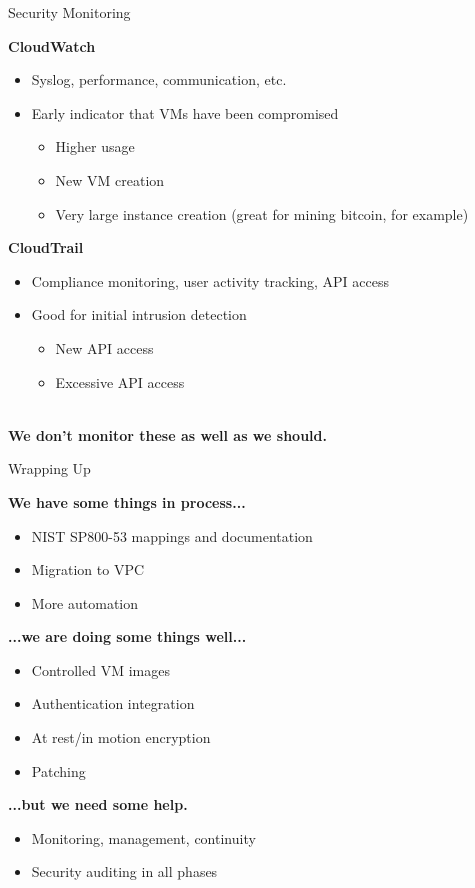 \documentclass[t,handout]{beamer}   %
\begin{document}
\begin{frame}{Security Monitoring}

\textbf{CloudWatch}
{\small
\begin{itemize}
\item Syslog, performance, communication, etc.
\item Early indicator that VMs have been compromised
\begin{itemize}
\item Higher usage
\item New VM creation
\item Very large instance creation (great for mining bitcoin, for example)
\end{itemize}
\end{itemize}
}

\textbf{CloudTrail}
{\small
\begin{itemize}
\item Compliance monitoring, user activity tracking, API access
\item Good for initial intrusion detection
\begin{itemize}
\item New API access
\item Excessive API access
\end{itemize}
\end{itemize}
}
~\\
\centering
\textbf{We don't monitor these as well as we should.}
\end{frame}

\begin{frame}{Wrapping Up}

\textbf{We have some things in process...}
{\small
\begin{itemize}
\item NIST SP800-53 mappings and documentation
\item Migration to VPC
\item More automation
\end{itemize}
}

\textbf{...we are doing some things well...}
{\small
\begin{itemize}
\item Controlled VM images
\item Authentication integration
\item At rest/in motion encryption
\item Patching
\end{itemize}
}

\textbf{...but we need some help.}
{\small
\begin{itemize}
\item Monitoring, management, continuity
\item Security auditing in all phases
\end{itemize}
}

\end{frame}

\end{document}

